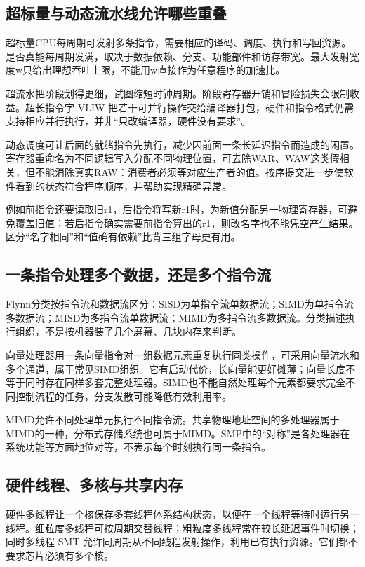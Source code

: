 \subsection{超标量与动态流水线允许哪些重叠}\label{co-06-04}

超标量CPU每周期可发射多条指令，需要相应的译码、调度、执行和写回资源。是否真能每周期发满，取决于数据依赖、分支、功能部件和访存带宽。最大发射宽度w只给出理想吞吐上限，不能用w直接作为任意程序的加速比。

超流水把阶段划得更细，试图缩短时钟周期。阶段寄存器开销和冒险损失会限制收益。超长指令字 VLIW 把若干可并行操作交给编译器打包，硬件和指令格式仍需支持相应并行执行，并非``只改编译器，硬件没有要求''。

动态调度可让后面的就绪指令先执行，减少因前面一条长延迟指令而造成的闲置。寄存器重命名为不同逻辑写入分配不同物理位置，可去除WAR、WAW这类假相关，但不能消除真实RAW：消费者必须等对应生产者的值。按序提交进一步使软件看到的状态符合程序顺序，并帮助实现精确异常。

例如前指令还要读取旧r1，后指令将写新r1时，为新值分配另一物理寄存器，可避免覆盖旧值；若后指令确实需要前指令算出的r1，则改名字也不能凭空产生结果。区分``名字相同''和``值确有依赖''比背三组字母更有用。

\subsection{一条指令处理多个数据，还是多个指令流}\label{co-06-05}

Flynn分类按指令流和数据流区分：SISD为单指令流单数据流；SIMD为单指令流多数据流；MISD为多指令流单数据流；MIMD为多指令流多数据流。分类描述执行组织，不是按机器装了几个屏幕、几块内存来判断。

向量处理器用一条向量指令对一组数据元素重复执行同类操作，可采用向量流水和多个通道，属于常见SIMD组织。它有启动代价，长向量能更好摊薄；向量长度不等于同时存在同样多套完整处理器。SIMD也不能自然处理每个元素都要求完全不同控制流程的任务，分支发散可能降低有效利用率。

MIMD允许不同处理单元执行不同指令流。共享物理地址空间的多处理器属于MIMD的一种，分布式存储系统也可属于MIMD。SMP中的``对称''是各处理器在系统功能等方面地位对等，不表示每个时刻执行同一条指令。

\subsection{硬件线程、多核与共享内存}\label{co-06-06}

硬件多线程让一个核保存多套线程体系结构状态，以便在一个线程等待时运行另一线程。细粒度多线程可按周期交替线程；粗粒度多线程常在较长延迟事件时切换；同时多线程 SMT 允许同周期从不同线程发射操作，利用已有执行资源。它们都不要求芯片必须有多个核。

